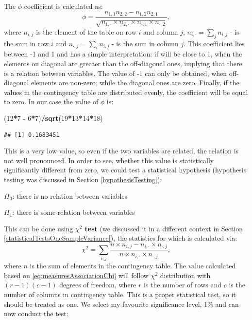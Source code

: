 \documentclass[
]{book}
\newenvironment{Shaded}{\begin{snugshade}}{\end{snugshade}}
\newcommand{\DecValTok}[1]{\textcolor[rgb]{0.00,0.00,0.81}{#1}}
\newcommand{\FunctionTok}[1]{\textcolor[rgb]{0.13,0.29,0.53}{\textbf{#1}}}
\newcommand{\NormalTok}[1]{#1}
\newcommand{\SpecialCharTok}[1]{\textcolor[rgb]{0.81,0.36,0.00}{\textbf{#1}}}
\theoremstyle{definition}
\theoremstyle{definition}
\theoremstyle{definition}
\theoremstyle{definition}
\theoremstyle{remark}
\begin{document}
The \(\phi\) coefficient is calculated as:
\begin{equation}
    \phi = \frac{n_{1,1} n_{2,2} - n_{1,2} n_{2,1}}{\sqrt{n_{1,\cdot}\times n_{2,\cdot}\times n_{\cdot,1}\times n_{\cdot,2}}} ,
    \label{eq:measuresAssociationPhi}
\end{equation}
where \(n_{i,j}\) is the element of the table on row \(i\) and column \(j\), \(n_{i,\cdot}=\sum_{j}n_{i,j}\) - is the sum in row \(i\) and \(n_{\cdot,j}=\sum_{i} n_{i,j}\) - is the sum in column \(j\). This coefficient lies between -1 and 1 and has a simple interpretation: if will be close to 1, when the elements on diagonal are greater than the off-diagonal ones, implying that there is a relation between variables. The value of -1 can only be obtained, when off-diagonal elements are non-zero, while the diagonal ones are zero. Finally, if the values in the contingency table are distributed evenly, the coefficient will be equal to zero. In our case the value of \(\phi\) is:

\begin{Shaded}
\begin{Highlighting}[]
\NormalTok{(}\DecValTok{12}\SpecialCharTok{*}\DecValTok{7} \SpecialCharTok{{-}} \DecValTok{6}\SpecialCharTok{*}\DecValTok{7}\NormalTok{)}\SpecialCharTok{/}\FunctionTok{sqrt}\NormalTok{(}\DecValTok{19}\SpecialCharTok{*}\DecValTok{13}\SpecialCharTok{*}\DecValTok{14}\SpecialCharTok{*}\DecValTok{18}\NormalTok{)}
\end{Highlighting}
\end{Shaded}

\begin{verbatim}
## [1] 0.1683451
\end{verbatim}

This is a very low value, so even if the two variables are related, the relation is not well pronounced. In order to see, whether this value is statistically significantly different from zero, we could test a statistical hypothesis (hypothesis testing was discussed in Section \ref{hypothesisTesting}):

\(H_0\): there is no relation between variables

\(H_1\): there is some relation between variables

This can be done using \textbf{\(\chi^2\) test} (we discussed it in a different context in Section \ref{statisticalTestsOneSampleVariance}), the statistics for which is calculated via:
\begin{equation}
    \chi^2 = \sum_{i,j} \frac{n \times n_{i,j} - n_{i,\cdot} \times n_{\cdot,j}}{n \times n_{i,\cdot} \times n_{\cdot,j}} ,
    \label{eq:measuresAssociationChi}
\end{equation}
where \(n\) is the sum of elements in the contingency table. The value calculated based on \eqref{eq:measuresAssociationChi} will follow \(\chi^2\) distribution with \((r-1)(c-1)\) degrees of freedom, where \(r\) is the number of rows and \(c\) is the number of columns in contingency table. This is a proper statistical test, so it should be treated as one. We select my favourite significance level, 1\% and can now conduct the test:
\end{document}
